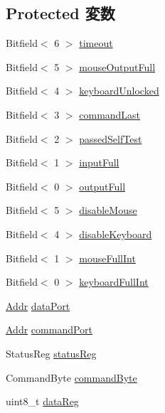 \subsection*{Protected 変数}
\begin{DoxyCompactItemize}
\item 
Bitfield$<$ 6 $>$ \hyperlink{classX86ISA_1_1I8042_a1e751f93440ec6b2aa8aba4c7336d6ea}{timeout}
\item 
Bitfield$<$ 5 $>$ \hyperlink{classX86ISA_1_1I8042_a43270e273e78021e88be7f7afe75721c}{mouseOutputFull}
\item 
Bitfield$<$ 4 $>$ \hyperlink{classX86ISA_1_1I8042_a4f11d228c35e9d97c1cc003762735a41}{keyboardUnlocked}
\item 
Bitfield$<$ 3 $>$ \hyperlink{classX86ISA_1_1I8042_a18c2dccc45c7e23576d55985c4b23eb5}{commandLast}
\item 
Bitfield$<$ 2 $>$ \hyperlink{classX86ISA_1_1I8042_a0a84c3649aab70a73e2c963a742a4643}{passedSelfTest}
\item 
Bitfield$<$ 1 $>$ \hyperlink{classX86ISA_1_1I8042_a39b55243e60ceda31d8762352cc3748c}{inputFull}
\item 
Bitfield$<$ 0 $>$ \hyperlink{classX86ISA_1_1I8042_a7f94b3d2e2e3de211854f0645c7e0ec6}{outputFull}
\item 
Bitfield$<$ 5 $>$ \hyperlink{classX86ISA_1_1I8042_ad59723c85703511350224ef784f6a9ac}{disableMouse}
\item 
Bitfield$<$ 4 $>$ \hyperlink{classX86ISA_1_1I8042_ac82b276112510c9b2475d568d42b4d9e}{disableKeyboard}
\item 
Bitfield$<$ 1 $>$ \hyperlink{classX86ISA_1_1I8042_a38053b2dbafabea0adbbe5a36998f465}{mouseFullInt}
\item 
Bitfield$<$ 0 $>$ \hyperlink{classX86ISA_1_1I8042_a212d28c640ebffd0723d406a3e85ba13}{keyboardFullInt}
\item 
\hyperlink{base_2types_8hh_af1bb03d6a4ee096394a6749f0a169232}{Addr} \hyperlink{classX86ISA_1_1I8042_af1be5149a7fbbf84684505d8ef42f46f}{dataPort}
\item 
\hyperlink{base_2types_8hh_af1bb03d6a4ee096394a6749f0a169232}{Addr} \hyperlink{classX86ISA_1_1I8042_a922fab707fbbc527ea7d1df668c33513}{commandPort}
\item 
StatusReg \hyperlink{classX86ISA_1_1I8042_a08336c94695c08fbcf6cb02060bd9b94}{statusReg}
\item 
CommandByte \hyperlink{classX86ISA_1_1I8042_a70ba06fc42f64ee547bc6ac1d84b8605}{commandByte}
\item 
uint8\_\-t \hyperlink{classX86ISA_1_1I8042_a09dcf88896631b75dbb19f2a5be01e30}{dataReg}

\end{DoxyCompactItemize}
